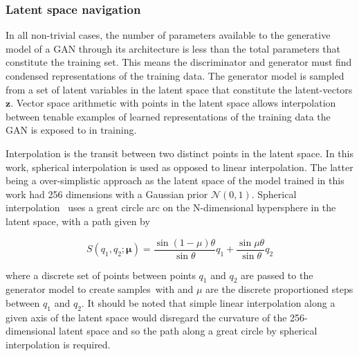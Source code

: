 \documentclass[twocolumn]{article}
\numberwithin{equation}{section}
\begin{document}
\subsubsection{Latent space navigation}\label{methods:z_navig}
In all non-trivial cases, the number of parameters available to the generative model of a GAN through its architecture is 
less than the total parameters that constitute the training set. This means the discriminator and generator must find 
condensed representations of the training data. The generator model is sampled from a set of latent variables in the 
latent space that constitute the latent-vectors $\mathbf{z}$. Vector space arithmetic with points in the latent space 
allows interpolation between tenable examples of learned representations of the training data the GAN is exposed to in 
training. 

Interpolation is the transit between two distinct points in the latent space. In this work, spherical interpolation is used
as opposed to linear interpolation. The latter being a over-simplistic approach as the latent space of the model trained in
this work had 256 dimensions with a Gaussian prior $\mathcal{N}(0,1)$. Spherical interpolation~\cite{spherical_interp} uses 
a great circle arc on the N-dimensional hypersphere in the latent space, with a path given by 

\begin{equation}
    S(q_1, q_2; \mathbf{\mu}) = \frac{\sin (1 - \mu)\theta}{\sin \theta}q_1 + \frac{\sin \mu\theta}{\sin \theta}q_2
\end{equation}

where a discrete set of points between points $q_1$ and $q_2$ are passed to the generator model to create samples~with and
$\mu$ are the discrete proportioned steps between $q_1$ and $q_2$. It should be noted that simple linear interpolation 
along a given axis of the latent space would disregard the curvature of the 256-dimensional latent space and so the path 
along a great circle by spherical interpolation is required.

\end{document}
